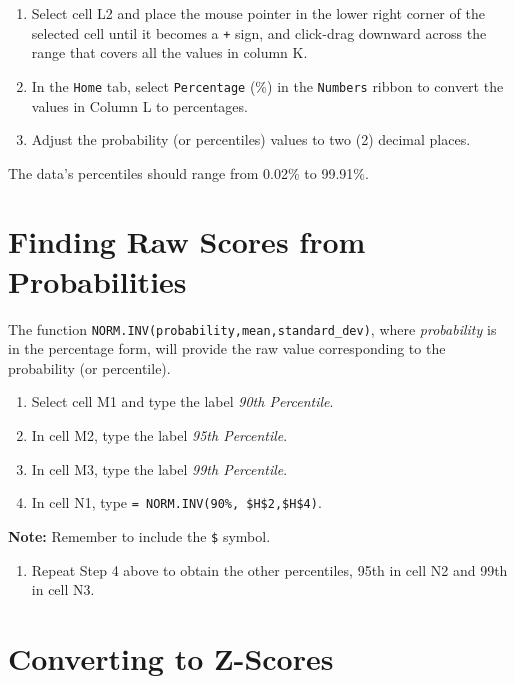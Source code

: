 \documentclass[
  12pt,
  letterpaper,
]{book}
\providecommand{\tightlist}{%
  \setlength{\itemsep}{0pt}\setlength{\parskip}{0pt}}
\begin{document}
\begin{enumerate}
\def\labelenumi{\arabic{enumi}.}
\setcounter{enumi}{2}
\tightlist
\item
  Select cell L2 and place the mouse pointer in the lower right corner of the selected cell until it becomes a \texttt{+} sign, and click-drag downward across the range that covers all the values in column K.
\item
  In the \texttt{Home} tab, select \texttt{Percentage} (\%) in the \texttt{Numbers} ribbon to convert the values in Column L to percentages.
\item
  Adjust the probability (or percentiles) values to two (2) decimal places.
\end{enumerate}

The data's percentiles should range from 0.02\% to 99.91\%.

\hypertarget{finding-raw-scores-from-probabilities}{%
\section{Finding Raw Scores from Probabilities}\label{finding-raw-scores-from-probabilities}}

The function \texttt{NORM.INV(probability,mean,standard\_dev)}, where \emph{probability} is in the percentage form, will provide the raw value corresponding to the probability (or percentile).

\begin{enumerate}
\def\labelenumi{\arabic{enumi}.}
\tightlist
\item
  Select cell M1 and type the label \emph{90th Percentile}.
\item
  In cell M2, type the label \emph{95th Percentile}.
\item
  In cell M3, type the label \emph{99th Percentile}.
\item
  In cell N1, type \texttt{=\ NORM.INV(90\%,\ \$H\$2,\$H\$4)}.
\end{enumerate}

\textbf{Note:} Remember to include the \texttt{\$} symbol.

\begin{enumerate}
\def\labelenumi{\arabic{enumi}.}
\setcounter{enumi}{4}
\tightlist
\item
  Repeat Step 4 above to obtain the other percentiles, 95th in cell N2 and 99th in cell N3.
\end{enumerate}

\hypertarget{converting-to-z-scores-1}{%
\section{Converting to Z-Scores}\label{converting-to-z-scores-1}}
\end{document}

